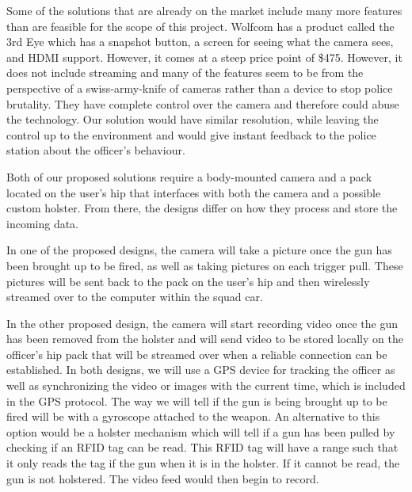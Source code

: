 \documentclass[12pt]{article}
\begin{document}
Some of the solutions that are already on the market include many more features
than are feasible for the scope of this project. Wolfcom has a product called
the 3rd Eye\cite{third_eye} which has a snapshot button, a screen for seeing
what the camera sees, and HDMI support. However, it comes at a steep price
point of \$475.  However, it does not include streaming and many of the
features seem to be from the perspective of a swiss-army-knife of cameras
rather than a device to stop police brutality.  They have complete control over
the camera and therefore could abuse the technology. Our solution would have
similar resolution, while leaving the control up to the environment and would
give instant feedback to the police station about the officer's behaviour.

Both of our proposed solutions require a body-mounted camera and a pack located
on the user’s hip that interfaces with both the camera and a possible custom
holster. From there, the designs differ on how they process and store the
incoming data.
        
In one of the proposed designs, the camera will take a picture once the gun has
been brought up to be fired, as well as taking pictures on each trigger pull.
These pictures will be sent back to the pack on the user’s hip and then
wirelessly streamed over to the computer within the squad car. 

In the other proposed design, the camera will start recording video once the
gun has been removed from the holster and will send video to be stored locally
on the officer’s hip pack that will be streamed over when a reliable connection
can be established. In both designs, we will use a GPS device for tracking the
officer as well as synchronizing the video or images with the current time,
which is included in the GPS protocol. The way we will tell if the gun is being
brought up to be fired will be with a gyroscope attached to the weapon. An
alternative to this option would be a holster mechanism which will tell if a
gun has been pulled by checking if an RFID tag can be read. This RFID tag will
have a range such that it only reads the tag if the gun when it is in the
holster. If it cannot be read, the gun is not holstered. The video feed would
then begin to record.
\end{document}
